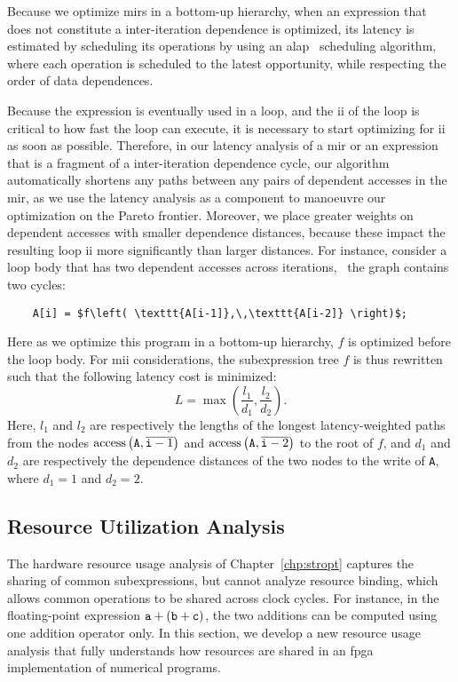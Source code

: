 Because we optimize \glspl{mir} in a bottom-up hierarchy, when an
expression that does not constitute a inter-iteration dependence is
optimized, its latency is estimated by scheduling its operations by using
an \gls{alap}~\cite{wang_hls} scheduling algorithm, where each operation
is scheduled to the latest opportunity, while respecting the order of data
dependences.

Because the expression is eventually used in a loop, and the \gls{ii} of
the loop is critical to how fast the loop can execute, it is necessary
to start optimizing for \gls{ii} as soon as possible.  Therefore, in our
latency analysis of a \gls{mir} or an expression that is a fragment of a
inter-iteration dependence cycle, our algorithm automatically shortens any
paths between any pairs of dependent accesses in the \gls{mir}\@, as we use the
latency analysis as a component to manoeuvre our optimization on the Pareto
frontier.  Moreover, we place greater weights on dependent accesses with
smaller dependence distances, because these impact the resulting loop \gls{ii}
more significantly than larger distances.  For instance, consider a loop body
that has two dependent accesses across iterations, \ie~the graph contains two
cycles:
\begin{lstlisting}
    A[i] = $f\left( \texttt{A[i-1]},\,\texttt{A[i-2]} \right)$;
\end{lstlisting}
Here as we optimize this program in a bottom-up hierarchy, $f$ is optimized
before the loop body.  For \gls{mii} considerations, the subexpression tree $f$
is thus rewritten such that the following latency cost is minimized:
\begin{equation}
    L = \max \left(
        \frac{l_1}{d_1}, \frac{l_2}{d_2}
    \right).
\end{equation}
Here, $l_1$ and $l_2$ are respectively the lengths
of the longest latency-weighted paths from the nodes
$\operatorname{\mathrm{access}}\left({\texttt{A}}, {\overline{\texttt{i}-1}}\right)$ and
$\operatorname{\mathrm{access}}\left({\texttt{A}}, {\overline{\texttt{i}-2}}\right)$ to the root of $f$, and $d_1$
and $d_2$ are respectively the dependence distances of the two nodes to the
write of \verb|A|, where $d_1 = 1$ and $d_2 = 2$.


\subsection{Resource Utilization Analysis}
\label{lo:sub:resource}

The hardware resource usage analysis of Chapter~\ref{chp:stropt} captures the
sharing of common subexpressions, but cannot analyze resource binding, which
allows common operations to be shared across clock cycles. For instance, in the
floating-point expression $\texttt{a} + (\texttt{b} + \texttt{c})$, the two additions can be
computed using one addition operator only.  In this section, we develop a new
resource usage analysis that fully understands how resources are shared in an
\gls{fpga} implementation of numerical programs.

